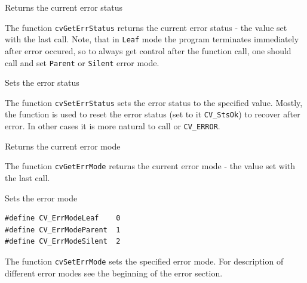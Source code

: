 \label{GetErrStatus}

Returns the current error status


The function \texttt{cvGetErrStatus} returns the current error status -
the value set with the last  call. Note, that in
\texttt{Leaf} mode the program terminates immediately after
error occured, so to always get control after the function call,
one should call  and set \texttt{Parent}
or \texttt{Silent} error mode.

\label{SetErrStatus}

Sets the error status


\begin{description}
\end{description}

The function \texttt{cvSetErrStatus} sets the error status to the specified value. Mostly, the function is used to reset the error status (set to it \texttt{CV\_StsOk}) to recover after error. In other cases it is more natural to call  or \texttt{CV\_ERROR}.

\label{GetErrMode}

Returns the current error mode


The function \texttt{cvGetErrMode} returns the current error mode - the value set with the last  call.

\label{SetErrMode}

Sets the error mode

\begin{lstlisting}
#define CV_ErrModeLeaf    0
#define CV_ErrModeParent  1
#define CV_ErrModeSilent  2
\end{lstlisting}


\begin{description}
\end{description}

The function \texttt{cvSetErrMode} sets the specified error mode. For description of different error modes see the beginning of the error section.

